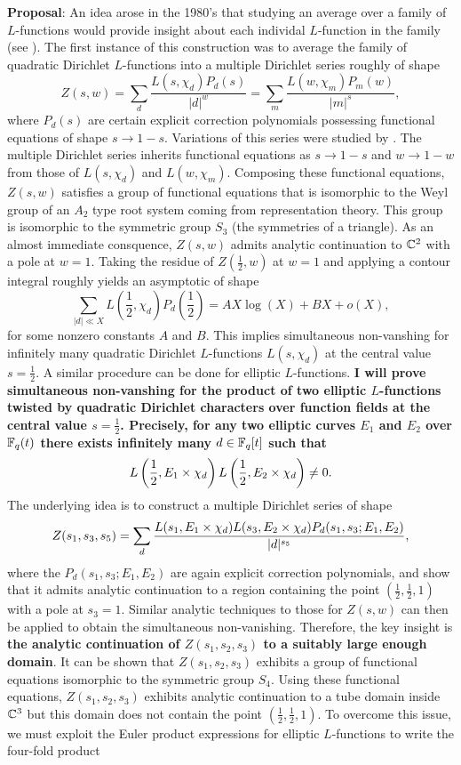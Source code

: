 \documentclass[12pt,reqno,oneside]{amsart}
\begin{document}
\textbf{Proposal}: An idea arose in the 1980's that studying an average over a family of $L$-functions would provide insight about each individal $L$-function in the family (see ). The first instance of this construction was to average the family of quadratic Dirichlet $L$-functions into a multiple Dirichlet series roughly of shape
\[
  Z(s,w) = \sum_{d}\frac{L(s,\chi_{d})P_{d}(s)}{|d|^{w}} = \sum_{m}\frac{L(w,\chi_{m})P_{m}(w)}{|m|^{s}},
\]
where $P_{d}(s)$ are certain explicit correction polynomials possessing functional equations of shape $s \to 1-s$. Variations of this series were studied by . The multiple Dirichlet series inherits functional equations as $s \to 1-s$ and $w \to 1-w$ from those of $L(s,\chi_{d})$ and $L(w,\chi_{m})$. Composing these functional equations, $Z(s,w)$ satisfies a group of functional equations that is isomorphic to the Weyl group of an $A_{2}$ type root system coming from representation theory. This group is isomorphic to the symmetric group $S_{3}$ (the symmetries of a triangle). As an almost immediate consquence, $Z(s,w)$ admits analytic continuation to $\mathbb{C}^{2}$ with a pole at $w = 1$. Taking the residue of $Z\left(\frac{1}{2},w\right)$ at $w = 1$ and applying a contour integral roughly yields an asymptotic of shape
\[
  \sum_{|d| \ll X}L\left(\frac{1}{2},\chi_{d}\right)P_{d}\left(\frac{1}{2}\right) = AX\log(X)+BX+o(X),
\]
for some nonzero constants $A$ and $B$. This implies simultaneous non-vanshing for infinitely many quadratic Dirichlet $L$-functions $L(s,\chi_{d})$ at the central value $s = \frac{1}{2}$. A similar procedure can be done for elliptic $L$-functions. \textbf{I will prove simultaneous non-vanshing for the product of two elliptic $L$-functions twisted by quadratic Dirichlet characters over function fields at the central value $s = \frac{1}{2}$. Precisely, for any two elliptic curves $E_{1}$ and $E_{2}$ over $\mathbb{F}_{q}(t)$ there exists infinitely many $d \in \mathbb{F}_{q}[t]$ such that
\[
  L\left(\frac{1}{2},E_{1} \times \chi_{d}\right)L\left(\frac{1}{2},E_{2} \times \chi_{d}\right) \neq 0.
\]}
The underlying idea is to construct a multiple Dirichlet series of shape
\[
  Z(s_{1},s_{3},s_{5}) = \sum_{d}\frac{L(s_{1},E_{1} \times \chi_{d})L(s_{3},E_{2} \times \chi_{d})P_{d}(s_{1},s_{3};E_{1},E_{2})}{|d|^{s_{5}}},
\]
where the $P_{d}(s_{1},s_{3};E_{1},E_{2})$ are again explicit correction polynomials, and show that it admits analytic continuation to a region containing the point $\left(\frac{1}{2},\frac{1}{2},1\right)$ with a pole at $s_{3} = 1$. Similar analytic techniques to those for $Z(s,w)$ can then be applied to obtain the simultaneous non-vanishing. Therefore, the key insight is \textbf{the analytic continuation of $Z(s_{1},s_{2},s_{3})$ to a suitably large enough domain}. It can be shown that $Z(s_{1},s_{2},s_{3})$ exhibits a group of functional equations isomorphic to the symmetric group $S_{4}$. Using these functional equations, $Z(s_{1},s_{2},s_{3})$ exhibits analytic continuation to a tube domain inside $\mathbb{C}^{3}$ but this domain does not contain the point $\left(\frac{1}{2},\frac{1}{2},1\right)$. To overcome this issue, we must exploit the Euler product expressions for elliptic $L$-functions to write the four-fold product
\end{document}
